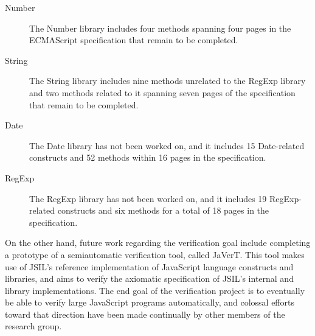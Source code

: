 \documentclass[a4paper,11pt,twoside]{report}
\begin{document}
\begin{description}
\item[Number] The Number library includes four methods spanning four pages in the ECMAScript specification that remain to be completed. 
\item[String] The String library includes nine methods unrelated to the RegExp library and two methods related to it spanning seven pages of the specification that remain to be completed.
\item[Date] The Date library has not been worked on, and it includes 15 Date-related constructs and 52 methods within 16 pages in the specification.
\item[RegExp] The RegExp library has not been worked on, and it includes 19 RegExp-related constructs and six methods for a total of 18 pages in the specification.
\end{description}

On the other hand, future work regarding the verification goal include completing a prototype of a semiautomatic verification tool, called JaVerT. This tool makes use of JSIL's reference implementation of JavaScript language constructs and libraries, and aims to verify the axiomatic specification of JSIL's internal and library implementations. The end goal of the verification project is to eventually be able to verify large JavaScript programs automatically, and colossal efforts toward that direction have been made continually by other members of the research group.



\end{document}
